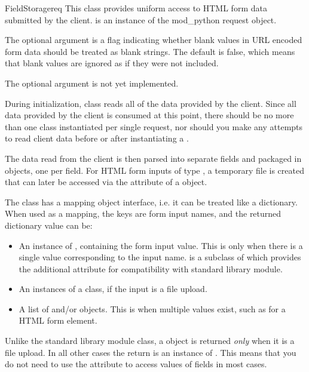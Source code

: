 \begin{classdesc}{FieldStorage}{req}
  This class provides uniform access to HTML form data submitted by the
  client.   is an instance of the mod_python request object.

  The optional argument  is a flag indicating
  whether blank values in URL encoded form data should be treated as
  blank strings. The default is false, which means that blank values are
  ignored as if they were not included.

  The optional argument  is not yet implemented.

  During initialization,  class reads all of the
  data provided by the client. Since all data provided by the client is
  consumed at this point, there should be no more than one
   class instantiated per single request, nor should
  you make any attempts to read client data before or after
  instantiating a .

  The data read from the client is then parsed into separate fields and
  packaged in  objects, one per field. For HTML form inputs
  of type , a temporary file is created that can later be
  accessed via the  attribute of a  object.

  The  class has a mapping object interface, i.e. it
  can be treated like a dictionary. When used as a mapping, the keys are
  form input names, and the returned dictionary value can be:

  \begin{itemize}
  \item
    An instance of , containing the form input
    value. This is only when there is a single value corresponding to the
    input name.  is a subclass of  which
    provides the additional  attribute for compatibility
    with standard library  module.
  \item
    An instances of a  class, if the input is a file upload.
  \item
    A list of  and/or  objects. This is
    when multiple values exist, such as for a  HTML form
    element.
  \end{itemize}

  \begin{notice}
    Unlike the standard library  module
     class, a  object is returned
    \emph{only} when it is a file upload. In all other cases the
    return is an instance of . This means that you
    do not need to use the  attribute to access values
    of fields in most cases.
  \end{notice}


\end{classdesc}
